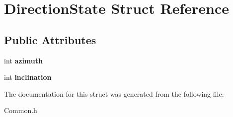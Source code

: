 \hypertarget{struct_direction_state}{\section{Direction\+State Struct Reference}
\label{struct_direction_state}
}
\subsection*{Public Attributes}
\begin{DoxyCompactItemize}
\item 
\hypertarget{struct_direction_state_a50d85e1e692dc39dcf03754cb1154d42}{int {\bfseries azimuth}}\label{struct_direction_state_a50d85e1e692dc39dcf03754cb1154d42}

\item 
\hypertarget{struct_direction_state_a3a2380ada725f632f657484da6d7627e}{int {\bfseries inclination}}\label{struct_direction_state_a3a2380ada725f632f657484da6d7627e}

\end{DoxyCompactItemize}


The documentation for this struct was generated from the following file\+:\begin{DoxyCompactItemize}
\item 
Common.\+h\end{DoxyCompactItemize}

